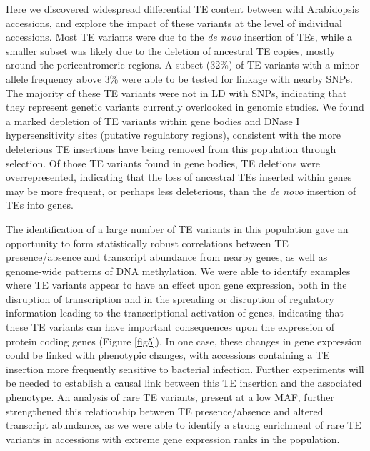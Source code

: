 \documentclass[12pt]{article}
\begin{document}
Here we discovered widespread differential TE content between wild
Arabidopsis accessions, and explore the impact of these variants at the
level of individual accessions. Most TE variants were due to the
\emph{de novo }insertion of TEs, while a smaller subset was likely due
to the deletion of ancestral TE copies, mostly around the
pericentromeric regions. A subset (32\%) of TE variants with a minor
allele frequency above 3\% were able to be tested for linkage with
nearby SNPs. The majority of these TE variants were not in LD with SNPs,
indicating that they represent genetic variants currently overlooked in
genomic studies. We found a marked depletion of TE variants within gene
bodies and DNase I hypersensitivity sites (putative regulatory regions),
consistent with the more deleterious TE insertions have being removed
from this population through selection. Of those TE variants found in
gene bodies, TE deletions were overrepresented, indicating that the loss
of ancestral TEs inserted within genes may be more frequent, or perhaps
less deleterious, than the \emph{de novo }insertion of TEs into genes.

The identification of a large number of TE variants in this population
gave an opportunity to form statistically robust correlations between TE
presence/absence and transcript abundance from nearby genes, as well as
genome-wide patterns of DNA methylation. We were able to identify
examples where TE variants appear to have an effect upon gene
expression, both in the disruption of transcription and in the spreading
or disruption of regulatory information leading to the transcriptional
activation of genes, indicating that these TE variants can have
important consequences upon the expression of protein coding genes
(Figure \ref{fig5}). In one case, these changes in gene expression could be
linked with phenotypic changes, with accessions containing a TE
insertion more frequently sensitive to bacterial infection. Further
experiments will be needed to establish a causal link between this TE
insertion and the associated phenotype. An analysis of rare TE variants,
present at a low MAF, further strengthened this relationship between TE
presence/absence and altered transcript abundance, as we were able to
identify a strong enrichment of rare TE variants in accessions with
extreme gene expression ranks in the population.
\end{document}
